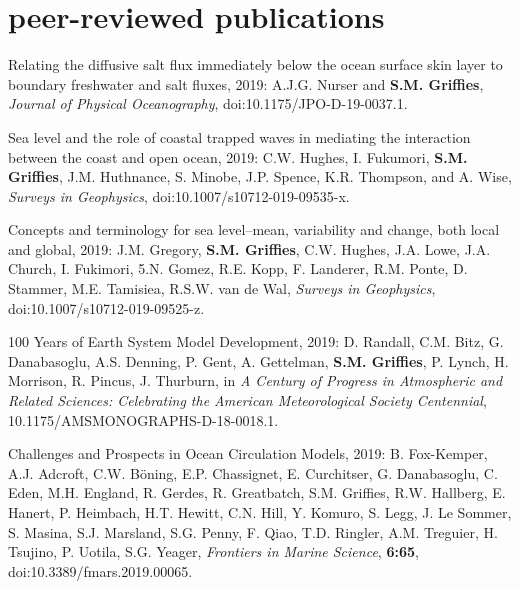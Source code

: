 \section*{\sc \color{Maroon} peer-reviewed publications}

\small 

\begin{etaremune}

\item Relating the diffusive salt flux immediately below the ocean surface skin layer to boundary freshwater and salt fluxes, 2019: A.J.G. Nurser and {\bf S.M. Grif\/f\/ies}, {\it Journal of Physical Oceanography}, doi:10.1175/JPO-D-19-0037.1.

\item Sea level and the role of coastal trapped waves in mediating the interaction between the coast and open ocean, 2019: C.W. Hughes, I. Fukumori, {\bf S.M. Grif\/f\/ies}, J.M. Huthnance, S. Minobe, J.P. Spence, K.R. Thompson, and A. Wise, {\it Surveys in Geophysics}, 
doi:10.1007/s10712-019-09535-x.

\item Concepts and terminology for sea level--mean, variability and change, both local and global, 2019: J.M. Gregory, {\bf S.M. Grif\/f\/ies}, C.W. Hughes, J.A. Lowe, J.A. Church, I. Fukimori, 5.N. Gomez, R.E. Kopp, F. Landerer, R.M. Ponte, D. Stammer, M.E. Tamisiea, R.S.W. van de Wal, {\it Surveys in Geophysics},
doi:10.1007/s10712-019-09525-z.

\item 100 Years of Earth System Model Development, 2019: D. Randall, C.M. Bitz, G. Danabasoglu, A.S. Denning, P. Gent, A. Gettelman, {\bf S.M. Grif\/f\/ies}, P. Lynch, H. Morrison, R. Pincus, J. Thurburn, in {\it A Century of Progress in Atmospheric and Related Sciences: Celebrating the American Meteorological Society Centennial}, 10.1175/AMSMONOGRAPHS-D-18-0018.1.

\item Challenges and Prospects in Ocean Circulation Models, 2019: B. Fox-Kemper, A.J. Adcroft, C.W. {B\"{o}ning}, E.P. Chassignet, E. Curchitser, G. Danabasoglu, C. Eden, M.H. England, R. Gerdes, R. Greatbatch, S.M. Grif\/f\/ies, R.W. Hallberg, E. Hanert, P. Heimbach, H.T. Hewitt, C.N. Hill, Y. Komuro, S. Legg, J. Le Sommer, S. Masina, S.J. Marsland, S.G. Penny, F. Qiao, T.D. Ringler, A.M. Treguier, H. Tsujino, P. Uotila, S.G. Yeager,
{\it Frontiers in Marine Science}, {\bf 6:65},
doi:10.3389/fmars.2019.00065.


\end{etaremune}
